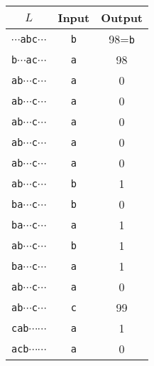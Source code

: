 \documentclass{article}
\begin{document}
\thispagestyle{empty}
\begin{tabular}{ccc}
 $L$ & Input & Output \\
\hline
{\tt $\cdots$abc$\cdots$} & {\tt b} & 98={\tt b}\\
{\tt b$\cdots$ac$\cdots$} & {\tt a} &    98\\
{\tt ab$\cdots$c$\cdots$} & {\tt a} &     0\\
{\tt ab$\cdots$c$\cdots$} & {\tt a} &     0\\
{\tt ab$\cdots$c$\cdots$} & {\tt a} &     0\\
{\tt ab$\cdots$c$\cdots$} & {\tt a} &     0\\
{\tt ab$\cdots$c$\cdots$} & {\tt a} &     0\\
{\tt ab$\cdots$c$\cdots$} & {\tt b} &     1\\
{\tt ba$\cdots$c$\cdots$} & {\tt b} &     0\\
{\tt ba$\cdots$c$\cdots$} & {\tt a} &     1\\
{\tt ab$\cdots$c$\cdots$} & {\tt b} &     1\\
{\tt ba$\cdots$c$\cdots$} & {\tt a} &     1\\
{\tt ab$\cdots$c$\cdots$} & {\tt a} &     0\\
{\tt ab$\cdots$c$\cdots$} & {\tt c} &    99\\
{\tt cab$\cdots$$\cdots$} & {\tt a} &     1\\    
{\tt acb$\cdots$$\cdots$} & {\tt a} &     0\\
\end{tabular}
\end{document}
